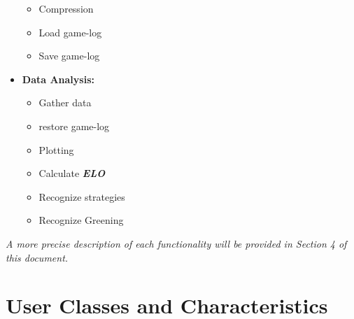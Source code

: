 \documentclass{scrreprt}
\begin{document}
\begin{itemize}
\begin{itemize}
    \item{Compression}
    \item{Load game-log}
    \item{Save game-log}
    \end{itemize}
  \item{\textbf{Data Analysis:}}
    \begin{itemize}
      \item{Gather data}
      \item{restore game-log}
      \item{Plotting}
      \item{Calculate \textit{\textbf{ELO}}}
      \item{Recognize strategies}
      \item{Recognize Greening}
    \end{itemize}
\end{itemize}
\textit{ A more precise description of each functionality will be provided in Section 4 of this document. }

\section{User Classes and Characteristics}
\end{document}
